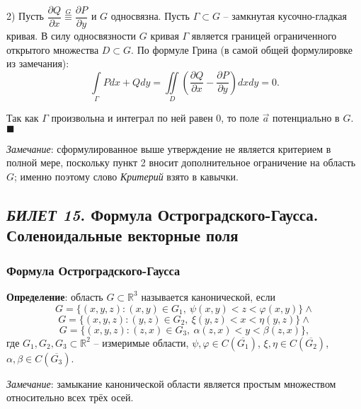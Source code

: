 \documentclass[12pt, a4paper, reqno]{article}
\begin{document}
    2) Пусть $\dfrac{\partial Q}{\partial x} \overset{G}{\equiv} \dfrac{\partial P}{\partial y}$
    и $G$ односвязна. Пусть $\Gamma \subset G$ -- замкнутая кусочно-гладкая кривая. В силу односвязности
    $G$ кривая $\Gamma$ является границей ограниченного открытого множества $D \subset G$. По
    формуле Грина (в самой общей формулировке из замечания):
    \begin{equation*}
        \int\limits_{\Gamma} Pdx + Qdy =
        \iint\limits_{D} \left(\frac{\partial Q}{\partial x} -
                               \frac{\partial P}{\partial y}\right) dx dy = 0.
    \end{equation*}

    Так как $\Gamma$ произвольна и интеграл по ней равен 0, то поле $\vec{a}$ потенциально в $G$.
    $\blacksquare$

    \textit{Замечание}: сформулированное выше утверждение не является критерием в полной мере,
    поскольку пункт 2 вносит дополнительное ограничение на область $G$; именно поэтому слово
    \textit{Критерий} взято в кавычки.

\newpage
\subsection{\textit{БИЛЕТ 15}. Формула Остроградского-Гаусса. Соленоидальные векторные поля}

    \subsubsection{Формула Остроградского-Гаусса}

    \textbf{Определение}: область $G \subset \mathbb{R}^3$ называется канонической, если
    \begin{equation*}
        G = \{(x, y, z): (x, y) \in G_1,\ \psi(x, y) < z < \varphi(x, y)\} \wedge
    \end{equation*}
    \begin{equation*}
        G = \{(x, y, z): (y, z) \in G_2,\ \xi(y, z) < x < \eta(y, z)\} \wedge
    \end{equation*}
    \begin{equation*}
        G = \{(x, y, z): (z, x) \in G_3,\ \alpha(z, x) < y < \beta(z, x)\},
    \end{equation*}
    где $G_1, G_2, G_3 \subset \mathbb{R}^2$ -- измеримые области, $\psi, \varphi \in C(\overline{G_1})$,
    $\xi, \eta \in C(\overline{G_2})$, $\alpha, \beta \in C(\overline{G_3})$.

    \textit{Замечание}: замыкание канонической области является простым множеством относительно всех
    трёх осей.
\end{document}
